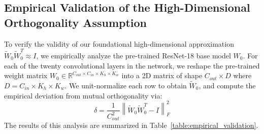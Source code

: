\documentclass{article}
\theoremstyle{plain}
\theoremstyle{definition}
\theoremstyle{remark}
\begin{document}
\subsection{Empirical Validation of the High-Dimensional Orthogonality Assumption}
\label{appendix:empirical_validation}
To verify the validity of our foundational high-dimensional approximation $\tilde{W}_0 \tilde{W}_0^T \approx I$, we empirically analyze the pre-trained ResNet-18 base model $W_0$. For each of the twenty convolutional layers in the network, we reshape the pre-trained weight matrix $W_0 \in \mathbb{R}^{C_{out} \times C_{in} \times K_h \times K_w}$ into a 2D matrix of shape $C_{out} \times D$ where $D = C_{in} \times K_h \times K_w$. We unit-normalize each row to obtain $\tilde{W}_0$, and compute the empirical deviation from mutual orthogonality via:
\begin{equation}
    \delta = \frac{1}{C_{out}^2} \left\| \tilde{W}_0 \tilde{W}_0^T - I \right\|_F^2
\end{equation}
The results of this analysis are summarized in Table~\ref{table:empirical_validation}.
\end{document}
